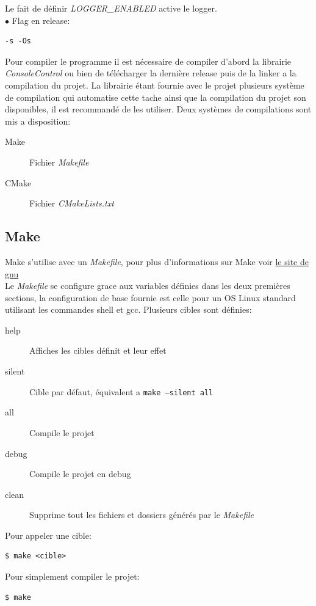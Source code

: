 \documentclass[article, backcover, french, nodocumentinfo]{upmethodology-document}
\begin{document}
				Le fait de définir \textit{LOGGER\_ENABLED} active le logger.\\
				$\bullet$ Flag en release:
				\begin{lstlisting}[breaklines=true,breakatwhitespace=true,breakindent=0pt,columns=fixed,keepspaces=true,frame=single,basicstyle=\footnotesize\sffamily]
-s -Os\end{lstlisting}
				Pour compiler le programme il est nécessaire de compiler d'abord la librairie \textit{ConsoleControl} ou bien de télécharger la dernière release puis de la linker a la compilation du projet. La librairie étant fournie avec le projet plusieurs système de compilation qui automatise cette tache ainsi que la compilation du projet son disponibles, il est recommandé de les utiliser.
				Deux systèmes de compilations sont mis a disposition:
				\begin{description}
					\item[Make] Fichier \textit{Makefile}
					\item[CMake] Fichier \textit{CMakeLists.txt}
				\end{description}
		\subsection{Make}
			Make s'utilise avec un \textit{Makefile}, pour plus d'informations sur Make voir \href{https://www.gnu.org/software/make/}{le site de gnu}\\
			Le \textit{Makefile} se configure grace aux variables définies dans les deux premières sections, la configuration de base fournie est celle pour un OS Linux standard utilisant les commandes shell et gcc.
				Plusieurs cibles sont définies:
				\begin{description}
					\item[help] Affiches les cibles définit et leur effet
					\item[silent] Cible par défaut, équivalent a \texttt{make --silent all}
					\item[all] Compile le projet
					\item[debug] Compile le projet en debug
					\item[clean] Supprime tout les fichiers et dossiers générés par le \textit{Makefile}
				\end{description}
				Pour appeler une cible:
				\begin{lstlisting}[breaklines=true,breakatwhitespace=true,breakindent=0pt,columns=fixed,keepspaces=true,frame=single,basicstyle=\footnotesize\sffamily]
$ make <cible>\end{lstlisting}
				Pour simplement compiler le projet:
				\begin{lstlisting}[breaklines=true,breakatwhitespace=true,breakindent=0pt,columns=fixed,keepspaces=true,frame=single,basicstyle=\footnotesize\sffamily]
$ make\end{lstlisting}
\end{document}
